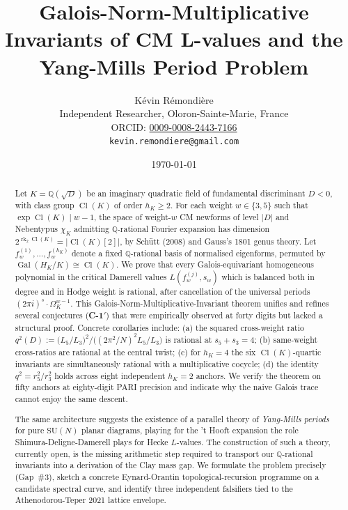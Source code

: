 \documentclass[11pt]{amsart}
\title[Galois-Norm-Multiplicative Invariants of CM L-values]{Galois-Norm-Multiplicative Invariants of CM L-values
and the Yang-Mills Period Problem}
\author{K\'evin R\'emondi\`ere\\
\small Independent Researcher, Oloron-Sainte-Marie, France\\
\small ORCID: \href{https://orcid.org/0009-0008-2443-7166}{0009-0008-2443-7166}\\
\small \texttt{kevin.remondiere@gmail.com}}
\date{\today}
\theoremstyle{definition}
\theoremstyle{remark}
\DeclareMathOperator{\Cl}{Cl}
\DeclareMathOperator{\rk}{rk}
\DeclareMathOperator{\Gal}{Gal}
\newcommand{\Q}{\mathbb{Q}}
\newcommand{\HK}{H_K}
\newcommand{\chiK}{\chi_K}
\begin{document}
\begin{abstract}
Let $K = \Q(\sqrt{D})$ be an imaginary quadratic field of fundamental
discriminant $D < 0$, with class group $\Cl(K)$ of order $h_K \geq 2$.
For each weight $w \in \{3,5\}$ such that $\exp \Cl(K) \mid w - 1$, the
space of weight-$w$ CM newforms of level $|D|$ and Nebentypus $\chiK$
admitting $\Q$-rational Fourier expansion has dimension
$2^{\rk_2 \Cl(K)} = |\Cl(K)[2]|$, by Sch\"utt (2008) and Gauss's 1801
genus theory. Let $f_w^{(1)}, \dots, f_w^{(h_K)}$ denote a fixed
$\Q$-rational basis of normalised eigenforms, permuted by $\Gal(\HK/K)
\cong \Cl(K)$. We prove that every Galois-equivariant homogeneous
polynomial in the critical Damerell values $L(f_w^{(j)}, s_w)$ which
is balanced both in degree and in Hodge weight is rational, after
cancellation of the universal periods $(2\pi i)^{s} \cdot \Omega_K^{w-1}$.
This Galois-Norm-Multiplicative-Invariant theorem unifies and refines
several conjectures (\textbf{C-1$'$}) that were empirically observed at
forty digits but lacked a structural proof. Concrete corollaries
include: (a) the squared cross-weight ratio
$q^2(D) := \bigl(L_5/L_3\bigr)^2 / \bigl((2\pi^2/N)^2 L_5/L_3 \bigr)$
is rational at $s_5 + s_3 = 4$; (b) same-weight cross-ratios are
rational at the central twist; (c) for $h_K = 4$ the six
$\Cl(K)$-quartic invariants are simultaneously rational with a
multiplicative cocycle; (d) the identity $q^2 = r_5^2 / r_3^2$ holds
across eight independent $h_K = 2$ anchors. We verify the theorem on
fifty anchors at eighty-digit PARI precision and indicate why the
naive Galois trace cannot enjoy the same descent.

The same architecture suggests the existence of a parallel theory of
\emph{Yang-Mills periods} for pure $\mathrm{SU}(N)$ planar diagrams,
playing for the 't Hooft expansion the role Shimura-Deligne-Damerell
plays for Hecke $L$-values. The construction of such a theory, currently
open, is the missing arithmetic step required to transport our
$\Q$-rational invariants into a derivation of the Clay mass gap. We
formulate the problem precisely (Gap~\#3), sketch a concrete
Eynard-Orantin topological-recursion programme on a candidate spectral
curve, and identify three independent falsifiers tied to the
Athenodorou-Teper 2021 lattice envelope.
\end{abstract}

\maketitle
\end{document}
